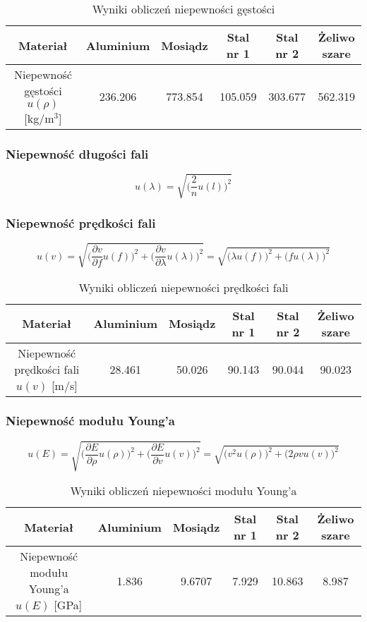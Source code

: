 \documentclass[a4paper,12pts]{article}
\begin{document}
\begin{table}[h!]
	\centering
	\begin{tabular}{|c|c|c|c|c|c|}
		\hline
		\textrm{Materiał} & \textrm{Aluminium} & \textrm{Mosiądz} & \textrm{Stal nr 1} & \textrm{Stal nr 2}  & \textrm{Żeliwo szare}  \\ \hline
		\textrm{Niepewność gęstości $u(\rho)$ [kg/m$^3$] } & 236.206 & 773.854 & 105.059 & 303.677 & 562.319 \\ \hline
	\end{tabular}	
\caption{Wyniki obliczeń niepewności gęstości}
\label{Tabela7}	
\end{table}

	\subsubsection{Niepewność długości fali}	
	$$ u(\lambda)=\sqrt{\bigg(\frac{2}{n}u(l)\bigg)^2}$$
	
	\subsubsection{Niepewność prędkości fali}
	$$ u(v)=\sqrt{\bigg(\frac{\partial v}{\partial f}u(f)\bigg)^2+\bigg(\frac{\partial v}{\partial \lambda}u(\lambda)\bigg)^2}=\sqrt{\bigg(\lambda u(f)\bigg)^2+\bigg(f u(\lambda)\bigg)^2}$$
	
	\begin{table}[h!]
		\centering
		\begin{tabular}{|c|c|c|c|c|c|}
			\hline
			\textrm{Materiał} & \textrm{Aluminium} & \textrm{Mosiądz} & \textrm{Stal nr 1} & \textrm{Stal nr 2}  & \textrm{Żeliwo szare}  \\ \hline
			\textrm{Niepewność prędkości fali $u(v)$ [m/s] } & 28.461 & 50.026 & 90.143 & 90.044 & 90.023 \\ \hline
		\end{tabular}	
		\caption{Wyniki obliczeń niepewności prędkości fali}
		\label{Tabela8}	
	\end{table}
	
	\subsubsection{Niepewność modułu Young'a}
	$$ u(E)=\sqrt{\bigg(\frac{\partial E}{\partial \rho}u(\rho)\bigg)^2+\bigg(\frac{\partial E}{\partial v}u(v)\bigg)^2} =
	\sqrt{\bigg(v^2 u(\rho)\bigg)^2+\bigg(2 \rho v u(v)\bigg)^2}$$

	\begin{table}[h!]
	\centering
	\begin{tabular}{|c|c|c|c|c|c|}
		\hline
		\textrm{Materiał} & \textrm{Aluminium} & \textrm{Mosiądz} & \textrm{Stal nr 1} & \textrm{Stal nr 2}  & \textrm{Żeliwo szare}  \\ \hline
		\textrm{Niepewność modułu Young'a $u(E)$ [GPa] } & 1.836 & 9.6707 & 7.929 & 10.863 & 8.987 \\ \hline
	\end{tabular}	
	\caption{Wyniki obliczeń niepewności modułu Young'a}
	\label{Tabela9}	
	\end{table}
	
\end{document}
